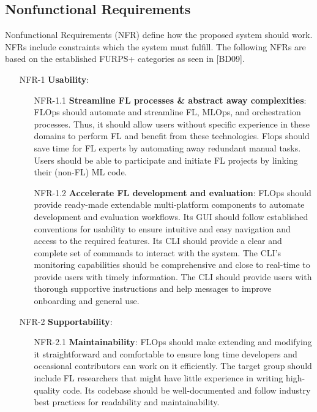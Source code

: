 \subsection{Nonfunctional Requirements}
Nonfunctional Requirements (NFR) define how the proposed system should work.
NFRs include constraints which the system must fulfill.
The following NFRs are based on the established FURPS+ categories as seen in [BD09].

\begin{itemize}
    \item [NFR-1] {\textbf{Usability}}:
        \begin{itemize}
        \item [NFR-1.1] \textbf{Streamline FL processes \& abstract away complexities}:
            FLOps should automate and streamline FL, MLOps, and orchestration processes.
            Thus, it should allow users without specific experience in these domains to perform FL and benefit from these technologies.
            Flops should save time for FL experts by automating away redundant manual tasks.
            Users should be able to participate and initiate FL projects by linking their (non-FL) ML code.
        \item [NFR-1.2] \textbf{Accelerate FL development and evaluation}: 
            FLOps should provide ready-made extendable multi-platform components to automate development and evaluation workflows.    
            Its GUI should follow established conventions for usability to ensure intuitive and easy navigation and access to the required features.
            Its CLI should provide a clear and complete set of commands to interact with the system.
            The CLI's monitoring capabilities should be comprehensive and close to real-time to provide users with timely information.
            The CLI should provide users with thorough supportive instructions and help messages to improve onboarding and general use.
        \end{itemize}
    \item [NFR-2] {\textbf{Supportability}}:
        \begin{itemize}
        \item [NFR-2.1] {\textbf{Maintainability}}:
            FLOps should make extending and modifying it straightforward and comfortable to ensure long time developers and occasional contributors can work on it efficiently.
            The target group should include FL researchers that might have little experience in writing high-quality code.
            Its codebase should be well-documented and follow industry best practices for readability and maintainability.

\end{itemize}
\end{itemize}
